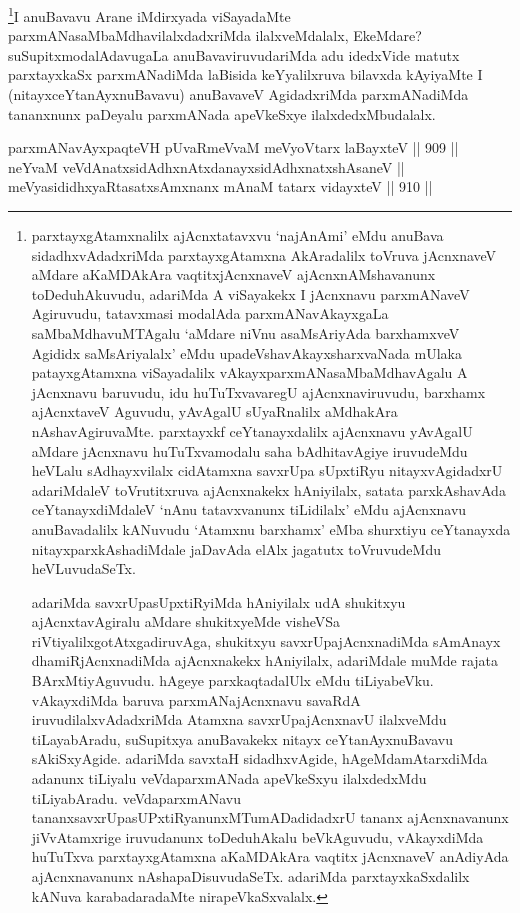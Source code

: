 \begin{artha}
\footnote{parxtayxgAtamxnalilx ajAcnxtatavxvu `najAnAmi' eMdu anuBava sidadhxvAdadxriMda parxtayxgAtamxna AkAradalilx toVruva jAcnxnaveV aMdare aKaMDAkAra vaqtitxjAcnxnaveV ajAcnxnAMshavanunx toDeduhAkuvudu, adariMda A viSayakekx I jAcnxnavu parxmANaveV Agiruvudu, tatavxmasi modalAda parxmANavAkayxgaLa saMbaMdhavuMTAgalu `aMdare niVnu asaMsAriyAda barxhamxveV Agididx saMsAriyalalx' eMdu upadeVshavAkayxsharxvaNada mUlaka patayxgAtamxna viSayadalilx vAkayxparxmANasaMbaMdhavAgalu A jAcnxnavu baruvudu, idu huTuTxvavaregU ajAcnxnaviruvudu, barxhamx ajAcnxtaveV Aguvudu, yAvAgalU sUyaRnalilx aMdhakAra nAshavAgiruvaMte. parxtayxkf ceYtanayxdalilx ajAcnxnavu yAvAgalU aMdare jAcnxnavu huTuTxvamodalu saha bAdhitavAgiye iruvudeMdu heVLalu sAdhayxvilalx cidAtamxna savxrUpa sUpxtiRyu nitayxvAgidadxrU adariMdaleV toVrutitxruva ajAcnxnakekx hAniyilalx, satata parxkAshavAda ceYtanayxdiMdaleV `nAnu tatavxvanunx tiLidilalx' eMdu ajAcnxnavu anuBavadalilx kANuvudu `Atamxnu barxhamx' eMba shurxtiyu ceYtanayxda nitayxparxkAshadiMdale jaDavAda elAlx jagatutx toVruvudeMdu heVLuvudaSeTx.

adariMda savxrUpasUpxtiRyiMda hAniyilalx udA shukitxyu ajAcnxtavAgiralu aMdare shukitxyeMde visheVSa riVtiyalilxgotAtxgadiruvAga, shukitxyu savxrUpajAcnxnadiMda sAmAnayx dhamiRjAcnxnadiMda ajAcnxnakekx hAniyilalx, adariMdale muMde rajata BArxMtiyAguvudu. hAgeye parxkaqtadalUlx eMdu tiLiyabeVku. vAkayxdiMda baruva parxmANajAcnxnavu savaRdA iruvudilalxvAdadxriMda Atamxna savxrUpajAcnxnavU ilalxveMdu tiLayabAradu, suSupitxya anuBavakekx nitayx ceYtanAyxnuBavavu sAkiSxyAgide. adariMda savxtaH sidadhxvAgide, hAgeMdamAtarxdiMda adanunx tiLiyalu veVdaparxmANada apeVkeSxyu ilalxdedxMdu tiLiyabAradu. veVdaparxmANavu tananxsavxrUpasUPxtiRyanunxMTumADadidadxrU tananx ajAcnxnavanunx jiVvAtamxrige iruvudanunx toDeduhAkalu beVkAguvudu, vAkayxdiMda huTuTxva parxtayxgAtamxna aKaMDAkAra vaqtitx jAcnxnaveV anAdiyAda ajAcnxnavanunx nAshapaDisuvudaSeTx. adariMda parxtayxkaSxdalilx kANuva karabadaradaMte nirapeVkaSxvalalx.}I anuBavavu Arane iMdirxyada viSayadaMte parxmANasaMbaMdhavilalxdadxriMda ilalxveMdalalx, EkeMdare? suSupitxmodalAdavugaLa anuBavaviruvudariMda adu idedxVide matutx parxtayxkaSx parxmANadiMda laBisida keYyalilxruva bilavxda kAyiyaMte I (nitayxceYtanAyxnuBavavu) anuBavaveV AgidadxriMda parxmANadiMda tananxnunx paDeyalu parxmANada apeVkeSxye ilalxdedxMbudalalx.
\end{artha}

\begin{shl}
parxmANavAyxpaqteVH pUvaRmeVvaM meVyoV\s tarx laBayxteV \hfill || 909 ||  \\
neYvaM veVdAnatxsidAdhxnAtxdanayxsidAdhxnatxshAsaneV || \\
meVyasididhxyaRtasatxsAmxnanx mAnaM tatarx vidayxteV \hfill || 910 ||  
\end{shl}

